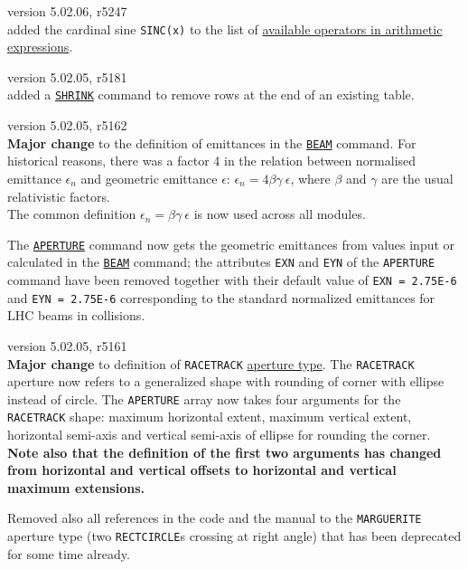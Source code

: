 \begin{madlist}
   version 5.02.06, r5247\\
  added the cardinal sine \texttt{SINC(x)} to the list of 
  \hyperref[subsec:operator]{available operators in arithmetic 
  expressions}.

   version 5.02.05, r5181\\
  added a \hyperref[sec:shrink]{\texttt{SHRINK}} command to remove 
  rows at the end of an existing table.

   version 5.02.05, r5162\\
  \textbf{Major change} to the definition of emittances in the 
  \hyperref[chap:beam]{\texttt{BEAM}} command. For historical reasons, 
  there was a factor 4 in the relation between normalised emittance 
  $\epsilon_n$ and geometric emittance $\epsilon$: 
  $\epsilon_n = 4 \beta \gamma \ \epsilon$, where $\beta$ and 
  $\gamma$ are the usual relativistic factors. \\
  The common definition $\epsilon_n = \beta \gamma \ \epsilon$ 
  is now used across all \madx modules.
  
  The \hyperref[sec:aperture]{\texttt{APERTURE}} command now gets the 
  geometric emittances from values input or calculated in the 
  \hyperref[chap:beam]{\texttt{BEAM}} command; the attributes
  \texttt{EXN} and \texttt{EYN} of the \texttt{APERTURE} command have
  been removed together with their default value of \texttt{EXN =
    2.75E-6} and \texttt{EYN = 2.75E-6} corresponding to the standard
  normalized emittances for LHC beams in collisions. 
  

   version 5.02.05, r5161\\
  \textbf{Major change} to definition of \texttt{RACETRACK} 
  \hyperref[sec:def-aper]{aperture type}. 
  The \texttt{RACETRACK} aperture now refers to a generalized shape 
  with rounding of corner with ellipse instead of circle. 
  The \texttt{APERTURE} array now takes four arguments for the 
  \texttt{RACETRACK} shape: maximum horizontal extent, maximum 
  vertical extent, horizontal semi-axis and vertical semi-axis 
  of ellipse for rounding the corner. \\
  \textbf{Note also that the definition of the first two arguments 
  has changed from horizontal and vertical offsets to horizontal 
  and vertical maximum extensions.}

  Removed also all references in the code and the manual to the 
  \texttt{MARGUERITE} aperture type (two \texttt{RECTCIRCLE}s 
  crossing at right angle) that has been deprecated for some 
  time already.


\end{madlist}
